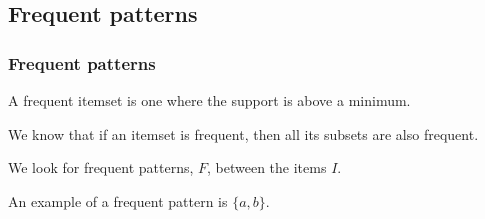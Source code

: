 
\subsection{Frequent patterns}

\subsubsection{Frequent patterns}

A frequent itemset is one where the support is above a minimum.

We know that if an itemset is frequent, then all its subsets are also frequent.

We look for frequent patterns, \(F\), between the items \(I\).

An example of a frequent pattern is \(\{a,b\}\).

